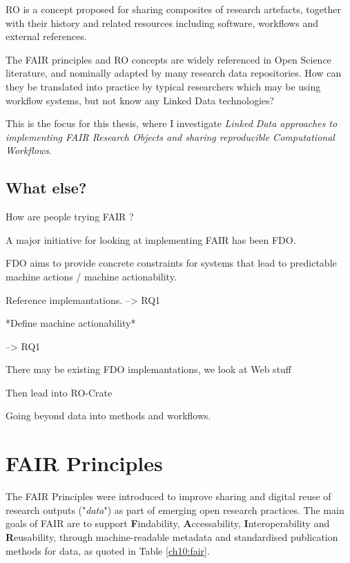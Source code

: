 \acrfull{RO} is a concept proposed for sharing composites of research artefacts, together with their history and related resources including software, workflows and external references.
 
The FAIR principles and RO concepts are widely referenced in Open Science literature, and nominally adapted by many research data repositories. How can they be translated into practice by typical researchers which may be using workflow systems, but not know any Linked Data technologies? 

This is the focus for this thesis, where I investigate \emph{Linked Data approaches to implementing FAIR Research Objects and sharing reproducible Computational Workflows}.

\subsection{What else?}




How are people trying FAIR ? 

A major initiative for looking at implementing FAIR has been FDO.

FDO aims to provide concrete constraints for systems that lead to predictable machine actions / machine actionability.

Reference implemantations. --> RQ1

*Define machine actionability*

--> RQ1

There may be existing FDO implemantations, we look at Web stuff


Then lead into RO-Crate


Going beyond data into methods and workflows.





\section{FAIR Principles}
\label{ch10:fair-principles}

The \acrshort{FAIR} Principles \cite{Wilkinson 2016} were introduced to improve sharing and digital reuse of research outputs ("\emph{data}") as part of emerging open research practices. The main goals of FAIR are to support \textbf{F}indability, \textbf{A}ccessability, \textbf{I}nteroperability and \textbf{R}eusability, through machine-readable metadata and standardised publication methods for data, as quoted in Table \vref{ch10:fair}.

